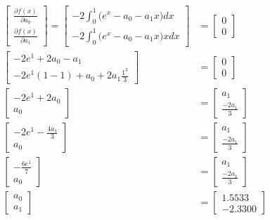\begin{align*}
\begin{bmatrix}
    \frac{\partial f(x)}{\partial a_0} \\ 
    \frac{\partial f(x)}{\partial a_1}
\end{bmatrix} =
\begin{bmatrix}
    -2 \int_{0}^{1} \Big( e^x - a_0 - a_1 x\Big) dx \\
    -2 \int_{0}^{1} \Big( e^x - a_0 - a_1 x\Big)x dx
\end{bmatrix} &= 
\begin{bmatrix}
    0 \\ 0
\end{bmatrix} \\
\begin{bmatrix}
    -2 e^1 +2a_0 -a_1 \\
    -2 e^1(1-1) +a_0 + 2a_1 \frac{1^3}{3}
\end{bmatrix} &= 
\begin{bmatrix}
0 \\ 0
\end{bmatrix} \\
\begin{bmatrix}
-2 e^1 +2a_0  \\
a_0
\end{bmatrix} &= 
\begin{bmatrix}
a_1 \\ \frac{-2a_1}{3}
\end{bmatrix} \\
\begin{bmatrix}
-2 e^1 - \frac{4a_1}{3}  \\
a_0
\end{bmatrix} &= 
\begin{bmatrix}
a_1 \\ \frac{-2a_1}{3}
\end{bmatrix} \\
\begin{bmatrix}
-\frac{6 e^1}{7}  \\
a_0
\end{bmatrix} &= 
\begin{bmatrix}
a_1\\ \frac{-2a_1}{3}
\end{bmatrix} \\
\begin{bmatrix}
a_0 \\ a_1
\end{bmatrix} &= 
\begin{bmatrix}
 1.5533 \\ -2.3300
\end{bmatrix} 
\end{align*}

